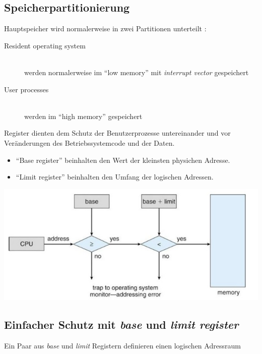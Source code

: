 \documentclass[a4paper]{scrreprt}
\begin{document}
\subsection{Speicherpartitionierung}

Hauptspeicher wird normalerweise in zwei Partitionen unterteilt :
\begin{description}
\item[Resident operating system]\ \\ werden normalerweise im "`low memory"' mit  \textit{interrupt vector} gespeichert
\item[User processes]\ \\werden im "`high memory"' gespeichert
\end{description}

Register dienten dem Schutz der Benutzerprozesse untereinander und vor Veränderungen des Betriebssystemcode und der Daten.
\begin{itemize}
\item "`Base register"' beinhalten den Wert der kleinsten physichen Adresse.
\item "`Limit register"' beinhalten den Umfang der logischen Adressen.
\end{itemize}

\begin{center}
		\includegraphics[scale=0.5]{graphics/baseandlimit.png}
\end{center}

\subsection{Einfacher Schutz mit \textit{base} und \textit{limit register}}

Ein Paar aus \textit{base} und \textit{limit} Registern definieren einen logischen Adressraum
\end{document}
